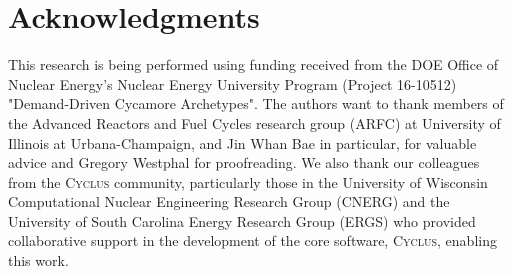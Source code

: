 \documentclass{anstrans}
\newcommand{\Cyclus}{\textsc{Cyclus}\xspace}%
\begin{document}
\section{Acknowledgments}
This research is being performed using funding received from the DOE Office of 
Nuclear Energy's Nuclear Energy University Program (Project 16-10512) 
"Demand-Driven Cycamore Archetypes". The authors want to thank members of the 
Advanced Reactors and Fuel Cycles research group (ARFC) at University of 
Illinois at Urbana-Champaign, and Jin Whan Bae in particular, for valuable advice and 
Gregory Westphal for proofreading. We also thank our colleagues from the 
\Cyclus community, particularly those in the University of Wisconsin 
Computational Nuclear Engineering Research Group (CNERG) and the University of 
South Carolina Energy Research Group (ERGS) who provided collaborative support 
in the development of the core software, \Cyclus, enabling this work. 



\end{document}
